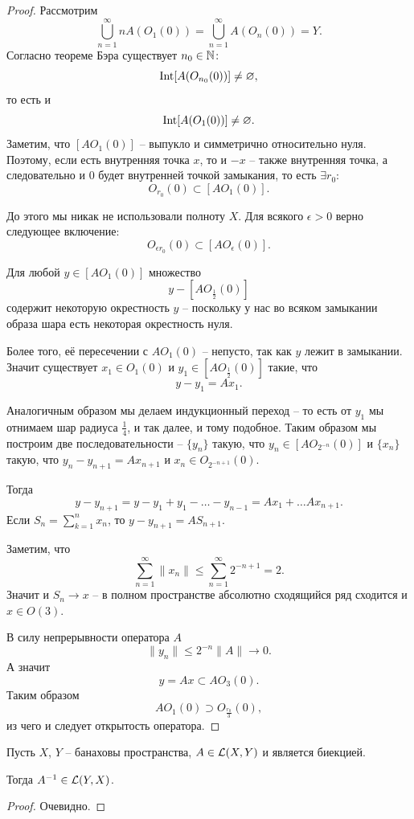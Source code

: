 \begin{proof}
    Рассмотрим
    \[
        \bigcup_{n = 1}^{\infty} nA(O_1(0)) = \bigcup_{n = 1}^{\infty} A(O_n(0)) = Y.
    \]
    Согласно теореме Бэра существует $n_0 \in \mathbb{N}\colon$
    \[
        \operatorname{Int} [A(O_{n_0}(0))] \neq \varnothing,
    \]
    то есть и
    \[
        \operatorname{Int} [A(O_1(0))] \neq \varnothing.
    \]
    Заметим, что $[AO_1(0)]$ -- выпукло и симметрично относительно нуля.
    Поэтому, если есть внутренняя точка $x$, то и $-x$ -- также внутренняя точка, а следовательно и 0 будет внутренней точкой замыкания, то есть $\exists r_0\colon$
    \[
        O_{r_0}(0) \subset [AO_1(0)].
    \]

    До этого мы никак не использовали полноту $X$.
    Для всякого $\epsilon > 0$ верно следующее включение:
    \[
        O_{\epsilon r_0}(0) \subset [AO_{\epsilon}(0)].
    \]

    Для любой $y \in [AO_1(0)]$ множество
    \[
        y - \left[AO_{\frac{1}{2}}(0)\right]
    \]
    содержит некоторую окрестность $y$ -- поскольку у нас во всяком замыкании образа шара есть некоторая окрестность нуля.

    Более того, её пересечении с $AO_1(0)$ -- непусто, так как $y$ лежит в замыкании.
    Значит существует $x_1 \in O_1(0)$ и $y_1 \in \left[AO_{\frac{1}{2}}(0)\right]$ такие, что
    \[
        y - y_1 = Ax_1.
    \]

    Аналогичным образом мы делаем индукционный переход -- то есть от $y_1$ мы отнимаем шар радиуса $\frac{1}{4}$, и так далее, и тому подобное.
    Таким образом мы построим две последовательности -- $\{y_n\}$ такую, что $y_n \in [AO_{2^{-n}}(0)]$ и $\{x_n\}$ такую, что $y_n - y_{n + 1} = Ax_{n + 1}$ и $x_n \in O_{2^{-n + 1}}(0)$.

    Тогда
    \[
        y - y_{n + 1} = y - y_1 + y_1 - \ldots - y_{n - 1} = Ax_1 + \ldots Ax_{n + 1}.
    \]
    Если $S_n = \sum_{k = 1}^{n}x_n$, то $y - y_{n + 1} = AS_{n + 1}$.

    Заметим, что
    \[
        \sum_{n = 1}^{\infty} \|x_n\| \leq \sum_{n = 1}^{\infty} 2^{-n + 1} = 2.
    \]
    Значит и $S_n \rightarrow x$ -- в полном пространстве абсолютно сходящийся ряд сходится и $x \in O(3)$.

    В силу непрерывности оператора $A$
    \[
        \|y_n\| \leq 2^{-n}\|A\| \rightarrow 0.
    \]
    А значит
    \[
        y = Ax \subset AO_3(0).
    \]
    Таким образом
    \[
        AO_1(0) \supset O_{\frac{r_0}{3}}(0),
    \]
    из чего и следует открытость оператора.
\end{proof}
\begin{theorem}
    Пусть $X$, $Y$ -- банаховы пространства, $A \in \mathcal{L}(X, Y)$ и является биекцией.

    Тогда $A^{-1} \in \mathcal{L}(Y, X)$.
\end{theorem}
\begin{proof}
    Очевидно.
\end{proof}